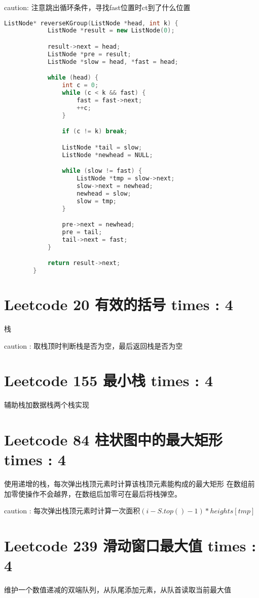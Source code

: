\documentclass[UTF8]{ctexart}
\begin{document}
caution: 注意跳出循环条件，寻找fast位置时ct到了什么位置
\begin{framed}
	\begin{lstlisting}[language=C++]
		ListNode* reverseKGroup(ListNode *head, int k) {
			ListNode *result = new ListNode(0);

			result->next = head;
			ListNode *pre = result;
			ListNode *slow = head, *fast = head;

			while (head) {
				int c = 0;
				while (c < k && fast) {
					fast = fast->next;
					++c;
				}

				if (c != k) break;

				ListNode *tail = slow;
				ListNode *newhead = NULL;

				while (slow != fast) {
					ListNode *tmp = slow->next;
					slow->next = newhead;
					newhead = slow;
					slow = tmp;
				}

				pre->next = newhead;
				pre = tail;
				tail->next = fast;
			}

			return result->next;
		}
	\end{lstlisting}
\end{framed}

\section{Leetcode 20 有效的括号 times : 4}
栈

caution : 取栈顶时判断栈是否为空，最后返回栈是否为空

\section{Leetcode 155 最小栈 times : 4}
辅助栈加数据栈两个栈实现

\section{Leetcode 84 柱状图中的最大矩形 times : 4}
使用递增的栈，每次弹出栈顶元素时计算该栈顶元素能构成的最大矩形
在数组前加零使操作不会越界，在数组后加零可在最后将栈弹空。

caution : 每次弹出栈顶元素时计算一次面积$(i - S.top() - 1) * heights[tmp]$

\section{Leetcode 239 滑动窗口最大值 times : 4}
维护一个数值递减的双端队列，从队尾添加元素，从队首读取当前最大值
\end{document}
